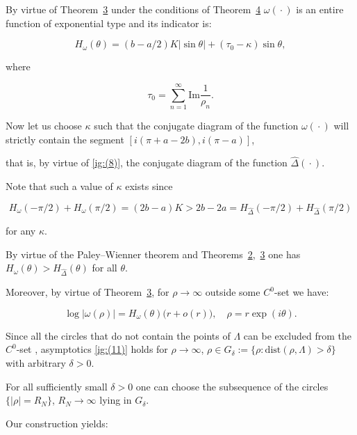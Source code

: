  By virtue of Theorem~\hyperlink{ign:th3}{3} under the conditions of Theorem~\hyperlink{ign:th4}{4} $\omega({}\cdot{})$ is an entire function of exponential type and its indicator is:

$$

H_\omega(\theta)=(b-a/2)K|\sin\theta|+(\tau_0-\kappa)\sin\theta,

$$

where

$$

\tau_0=\sum\limits_{n=1}^\infty \mbox{Im}\frac{1}{\rho_n}.

$$

Now let us choose $\kappa$ such that the conjugate diagram of the function $\omega({}\cdot{})$ will strictly contain the segment $[i(\pi+a-2b), i(\pi-a)]$, 

that is, by virtue of \eqref{ig:(8)}, the conjugate diagram of the function $\hat\Delta({}\cdot{})$. 

Note that such a value of $\kappa$ exists since

$$

H_\omega(-\pi/2)+H_\omega(\pi/2)=(2b-a)K> 2b-2a=H_{\hat\Delta}(-\pi/2)+H_{\hat\Delta}(\pi/2)

$$

for any $\kappa$. 

By virtue of the Paley--Wienner theorem and Theorems~\hyperlink{ign:th2}{2},~\hyperlink{ign:th3}{3} one has $H_\omega(\theta)>H_{\hat\Delta}(\theta)$ for all $\theta$. 

Moreover, by virtue of Theorem~\hyperlink{ign:th3}{3}, for $\rho\to\infty$ outside some $C^0$-set we have:

\begin{equation}

\log|\omega(\rho)|=H_\omega(\theta)\bigl(r+o(r)\bigr), \quad  \rho=r\exp(i\theta). 

\label{ig:(11)}

\end{equation}

Since all the circles that do not contain the points of $\Lambda$ can be excluded from the $C^0$-set \cite{ign:13}, asymptotics \eqref{ig:(11)} holds for $\rho\to\infty$, $\rho\in G_\delta:=\{\rho:\mbox{dist}(\rho,\Lambda)>\delta\}$ with arbitrary $\delta>0$. 

For all sufficiently small $\delta>0$ one can choose the subsequence of the circles $\{|\rho|=R_N\}$, $R_N\to\infty$ lying in $G_\delta$. 

Our construction yields:

